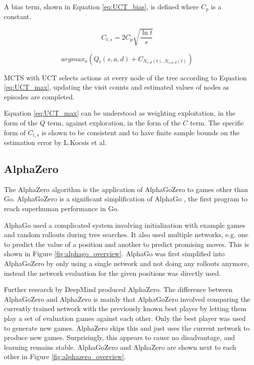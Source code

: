 \documentclass[12pt,onecolumn,oneside,titlepage]{article}
\begin{document}
A bias term, shown in Equation \ref{eq:UCT_bias}, is defined where $C_p$ is a constant.

\begin{equation}
 C_{t,s} = 2C_p \sqrt{\frac{\ln t}{s}}\label{eq:UCT_bias}
\end{equation}


\begin{equation}
 argmax_a(Q_t(s,a,d) + C_{N_{s,d}(t), N_{s,a,d}(t)}\label{eq:UCT_max})
\end{equation}

MCTS with UCT selects actions at every node of the tree according to Equation \ref{eq:UCT_max}, updating the visit counts and estimated values of nodes as episodes are completed.

Equation \ref{eq:UCT_max} can be understood as weighting exploitation, in the form of the $Q$ term,
against exploration, in the form of the $C$ term. The specific form of $C_{t,s}$ is shown to be consistent and to have finite sample bounds on the estimation error by L.Kocsis et al.


\subsection{AlphaZero}

The AlphaZero algorithm \cite{silver2018general} is the application of AlphaGoZero \cite{silver2017mastering} to games other than Go. AlphaGoZero is a significant simplification of AlphaGo \cite{silver2016mastering}, the first program to reach superhuman performance in Go.

AlphaGo used a complicated system involving initialization with example games and random rollouts during tree searches. It also used multiple networks, e.g. one to predict the value of a position and
another to predict promising moves. This is shown in Figure \ref{fig:alphago_overview}.
AlphaGo was first simplified into AlphaGoZero by only using a single network and not doing any rollouts anymore, instead the network evaluation for the given positions was directly used.

Further research by DeepMind produced AlphaZero. The difference between AlphaGoZero and AlphaZero is mainly that AlphaGoZero involved comparing the currently trained network with
the previously known best player by letting them play a set of evaluation games against each other.
Only the best player was used to generate new games. AlphaZero skips this and just uses the current network to produce new games. Surprisingly, this appears to cause no disadvantage, and learning remains stable.
AlphaGoZero and AlphaZero are shown next to each other in Figure \ref{fig:alphazero_overview}.
\end{document}

